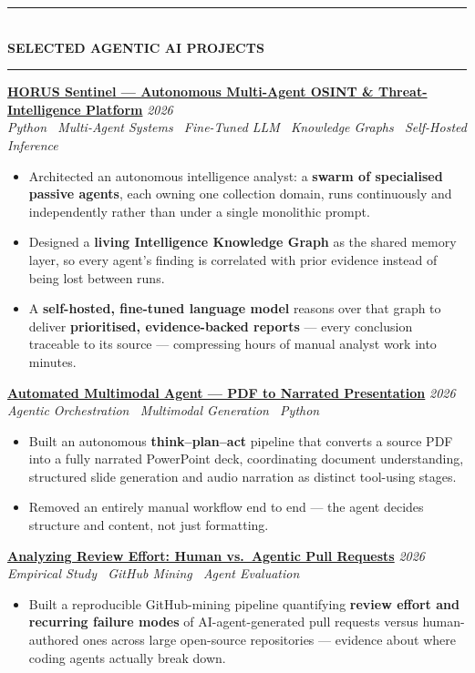 \documentclass[10pt, a4paper]{article}
\newcommand{\cvsection}[1]{%
  \vspace{3pt}%
  {\color{navy}\rule{\linewidth}{1.1pt}}\\[0.5pt]%
  {\color{navy}\bfseries\fontsize{9.5}{11}\selectfont\uppercase{#1}}\\[-4pt]%
  {\color{teal}\rule{\linewidth}{0.6pt}}%
  \vspace{2pt}%
}
\newcommand{\cvproject}[3]{%
  \vspace{2.5pt}%
  {\bfseries\color{navy}#1} \hfill {\color{midgray}\textit{#3}}\\[-1.5pt]%
  {\color{teal}\textit{#2}}%
}
\newenvironment{cvitems}{%
  \begin{itemize}[leftmargin=11pt, itemsep=0.5pt, parsep=0pt, topsep=1pt,
                  label={\textcolor{teal}{$\bullet$}}]
}{%
  \end{itemize}%
}
\begin{document}
\cvsection{Selected Agentic AI Projects}

\cvproject{\href{https://github.com/MahmoudAlyosify/horus-sentinel}{HORUS Sentinel --- Autonomous Multi-Agent OSINT \& Threat-Intelligence Platform}}
          {Python \textperiodcentered\ Multi-Agent Systems \textperiodcentered\ Fine-Tuned LLM \textperiodcentered\ Knowledge Graphs \textperiodcentered\ Self-Hosted Inference}
          {2026}
\begin{cvitems}
  \item Architected an autonomous intelligence analyst: a \textbf{swarm of specialised passive agents}, each owning one collection domain, runs continuously and independently rather than under a single monolithic prompt.
  \item Designed a \textbf{living Intelligence Knowledge Graph} as the shared memory layer, so every agent's finding is correlated with prior evidence instead of being lost between runs.
  \item A \textbf{self-hosted, fine-tuned language model} reasons over that graph to deliver \textbf{prioritised, evidence-backed reports} --- every conclusion traceable to its source --- compressing hours of manual analyst work into minutes.
\end{cvitems}

\cvproject{\href{https://github.com/MahmoudAlyosify/Automated-Multimodal-Agent-PDF-to-Narrated-PowerPoint}{Automated Multimodal Agent --- PDF to Narrated Presentation}}
          {Agentic Orchestration \textperiodcentered\ Multimodal Generation \textperiodcentered\ Python}
          {2026}
\begin{cvitems}
  \item Built an autonomous \textbf{think--plan--act} pipeline that converts a source PDF into a fully narrated PowerPoint deck, coordinating document understanding, structured slide generation and audio narration as distinct tool-using stages.
  \item Removed an entirely manual workflow end to end --- the agent decides structure and content, not just formatting.
\end{cvitems}

\cvproject{\href{https://github.com/MahmoudAlyosify/Analyzing-Review-Effort-in-Human-vs.-Agentic-Pull-Requests}{Analyzing Review Effort: Human vs.\ Agentic Pull Requests}}
          {Empirical Study \textperiodcentered\ GitHub Mining \textperiodcentered\ Agent Evaluation}
          {2026}
\begin{cvitems}
  \item Built a reproducible GitHub-mining pipeline quantifying \textbf{review effort and recurring failure modes} of AI-agent-generated pull requests versus human-authored ones across large open-source repositories --- evidence about where coding agents actually break down.
\end{cvitems}
\end{document}
